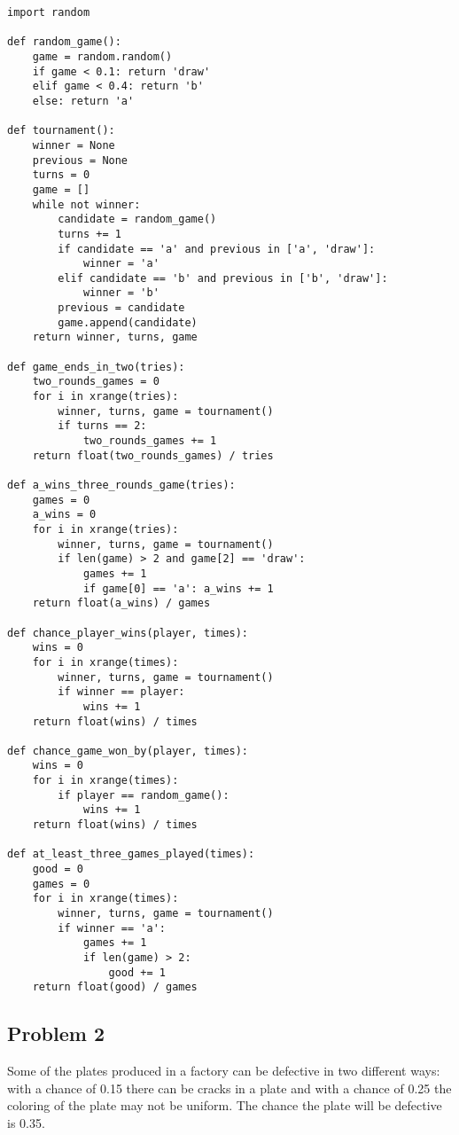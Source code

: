 \documentclass[11pt]{article}
\begin{document}
\begin{verbatim}
import random

def random_game():
    game = random.random()
    if game < 0.1: return 'draw'
    elif game < 0.4: return 'b'
    else: return 'a'

def tournament():
    winner = None
    previous = None
    turns = 0
    game = []
    while not winner:
        candidate = random_game()
        turns += 1
        if candidate == 'a' and previous in ['a', 'draw']:
            winner = 'a'
        elif candidate == 'b' and previous in ['b', 'draw']:
            winner = 'b'
        previous = candidate
        game.append(candidate)
    return winner, turns, game

def game_ends_in_two(tries):
    two_rounds_games = 0
    for i in xrange(tries):
        winner, turns, game = tournament()
        if turns == 2:
            two_rounds_games += 1
    return float(two_rounds_games) / tries

def a_wins_three_rounds_game(tries):
    games = 0
    a_wins = 0
    for i in xrange(tries):
        winner, turns, game = tournament()
        if len(game) > 2 and game[2] == 'draw':
            games += 1
            if game[0] == 'a': a_wins += 1
    return float(a_wins) / games

def chance_player_wins(player, times):
    wins = 0
    for i in xrange(times):
        winner, turns, game = tournament()
        if winner == player:
            wins += 1
    return float(wins) / times

def chance_game_won_by(player, times):
    wins = 0
    for i in xrange(times):
        if player == random_game():
            wins += 1
    return float(wins) / times

def at_least_three_games_played(times):
    good = 0
    games = 0
    for i in xrange(times):
        winner, turns, game = tournament()
        if winner == 'a':
            games += 1
            if len(game) > 2:
                good += 1
    return float(good) / games
\end{verbatim}
\subsection{Problem 2}
\label{sec-1-2}
Some of the plates produced in a factory can be defective in two different
ways: with a chance of 0.15 there can be cracks in a plate and with a chance
of 0.25 the coloring of the plate may not be uniform.  The chance the
plate will be defective is 0.35.
\end{document}

